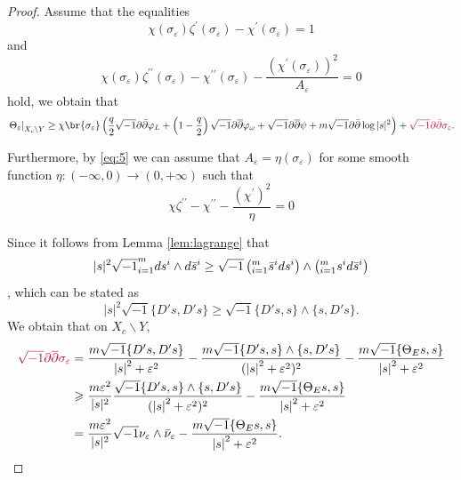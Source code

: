 \documentclass[lang=en,12pt,twoside]{textbook}
\let\sum\relax
\begin{document}
\begin{proof}
{\color{dblue} Assume that the equalities
\begin{equation}\label{eq:5}
  \chi\left(\sigma_{\varepsilon}\right) \zeta^{\prime}\left(\sigma_{\varepsilon}\right)-\chi^{\prime}\left(\sigma_{\varepsilon}\right)=1
\end{equation}
and
\begin{equation}\label{eq:6}
  \chi\left(\sigma_{\varepsilon}\right) \zeta^{\prime \prime}\left(\sigma_{\varepsilon}\right)-\chi^{\prime \prime}\left(\sigma_{\varepsilon}\right)-\frac{\left(\chi^{\prime}\left(\sigma_{\varepsilon}\right)\right)^2}{A_{\varepsilon}}=0
\end{equation}}
hold, we obtain that
\begin{equation}\label{eq:1.3}
  \left.\Theta_{\varepsilon}\right|_{X_c \backslash Y} \geq \chi\br{\sigma_\varepsilon}\left(\frac{q}{2}\sqrt{-1} \partial \bar{\partial} \varphi_{L}+\left(1-\frac{q}{2}\right)\xu\bd\bdd\varphi_\omega+\xu\bd\bdd\psi+m\sqrt{-1} \partial \bar{\partial} \log |s|^2\right)+{\color{purple} \sqrt{-1} \partial \bar{\partial} \sigma_{\varepsilon} }.
\end{equation}

Furthermore, by \eqref{eq:5} we can {\color{purple} assume that $A_{\varepsilon}=\eta\left(\sigma_{\varepsilon}\right)$} for some smooth function $\eta:(-\infty, 0) \longrightarrow(0,+\infty)$ such that
{\color{dblue} \begin{equation}\label{eq:8}
  \chi \zeta^{\prime \prime}-\chi^{\prime \prime}-\frac{\left(\chi^{\prime}\right)^2}{\eta}=0
\end{equation}}

Since it follows from Lemma \ref{lem:lagrange} that
$$
|s|^2 \sqrt{-1} \sum_{i=1}^m d s^i \wedge d \bar{s}^i \geq \sqrt{-1}\left(\sum_{i=1}^m \bar{s}^i d s^i\right) \wedge\left(\sum_{i=1}^m s^i d \bar{s}^i\right)
$$
, which can be stated as
\[
  |s|^2 \sqrt{-1} \{D's ,D's\} \geq \sqrt{-1} \{D's,s\}\wedge \{s,D's\}.
\]
We obtain that on $X_c\backslash Y$,
\begin{align*}
 {\color{purple}  \sqrt{-1}\partial\overline{\partial}\sigma_\varepsilon} &= \frac{m\sqrt{-1} \{D's ,D's\} }{\abs{s}^2+\varepsilon^2}-\frac{m \sqrt{-1} \{D's,s\}\wedge \{s,D's\} }{(\abs{s}^2+\varepsilon^2)^2}-\frac{m\sqrt{-1} \{\Theta_E s,s\}}{\abs{s}^2+\varepsilon^2}\\ 
  &\geqslant \frac{m \varepsilon^2}{|s|^2}\frac{\sqrt{-1} \{D's,s\}\wedge \{s,D's\} }{(\abs{s}^2+\varepsilon^2)^2}-\frac{m\sqrt{-1} \{\Theta_E s,s\}}{\abs{s}^2+\varepsilon^2}\\ 
  &=\frac{m \varepsilon^2}{|s|^2}\sqrt{-1} \nu_\varepsilon\wedge \bar\nu_{\varepsilon}-\frac{m\sqrt{-1} \{\Theta_E s,s\}}{\abs{s}^2+\varepsilon^2}.
\end{align*} 


\end{proof}
\end{document}
